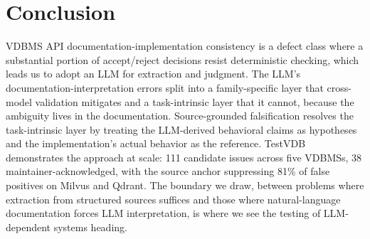 \documentclass[sigconf]{acmart}
\begin{document}
\section{Conclusion}

VDBMS API documentation-implementation consistency is a defect class where a substantial portion of accept/reject decisions resist deterministic checking, which leads us to adopt an LLM for extraction and judgment. The LLM's documentation-interpretation errors split into a family-specific layer that cross-model validation mitigates and a task-intrinsic layer that it cannot, because the ambiguity lives in the documentation. Source-grounded falsification resolves the task-intrinsic layer by treating the LLM-derived behavioral claims as hypotheses and the implementation's actual behavior as the reference. TestVDB demonstrates the approach at scale: 111 candidate issues across five VDBMSs, 38 maintainer-acknowledged, with the source anchor suppressing 81\% of false positives on Milvus and Qdrant. The boundary we draw, between problems where extraction from structured sources suffices and those where natural-language documentation forces LLM interpretation, is where we see the testing of LLM-dependent systems heading.



\end{document}
